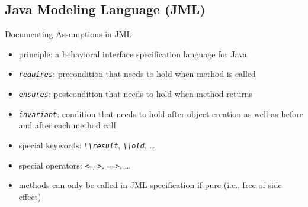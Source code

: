 \subsection{Java Modeling Language (JML)}
\begin{frame}{\insertsubsection}
	\begin{fancycolumns}
		\begin{exampletight}{Documenting Assumptions in JML}
			\centering\makebox{\usebox{\jml}} %
		\end{exampletight}
		\nextcolumn
		\begin{definition}{\insertsubsection{} \mysource{\designofjml}}
			\begin{itemize}
				\item principle: a behavioral interface specification language for Java
				\item \emph{\lstinline|requires|}: precondition that needs to hold when method is called
				\item \emph{\lstinline|ensures|}: postcondition that needs to hold when method returns
				\item \emph{\lstinline|invariant|}: condition that needs to hold after object creation as well as before and after each method call
				\item special keywords: \emph{\lstinline|\\result|}, \emph{\lstinline|\\old|}, \ldots
				\item special operators: \emph{\lstinline|<==>|}, \emph{\lstinline|==>|}, \ldots
				\item methods can only be called in JML specification if pure (i.e., free of side effect)
			\end{itemize}
		\end{definition}
	\end{fancycolumns}
\end{frame}

